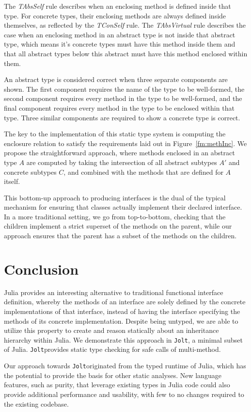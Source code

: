 \documentclass[preprint]{sigplanconf}
\newcommand{\xt}[1]{\texttt{#1}}
\newcommand{\jolt}{\xt{Jolt}}
\begin{document}
The \textit{TAbsSelf} rule describes when an enclosing method is defined inside that type. 
For concrete types, their enclosing methods are always defined inside themselves, as reflected by the \textit{TConSelf} rule.
The \textit{TAbsVirtual} rule describes the case when an enclosing method in an abstract type 
is not inside that abstract type, which means it's concrete types must have this method inside them
and that all abstract types below this abstract must have this method enclosed within them.

An abstract type is considered correct when three separate components are shown. The first component requires the name of the type to be well-formed, 
the second component requires every method in the type to be well-formed, and the final component requires every method in the type to be enclosed within that type. 
Three similar components are required to show a concrete type is correct.

The key to the implementation of this static type system is computing the 
enclosure relation to satisfy the requirements laid out in Figure~\ref{fm:methInc}.
We propose the straightforward approach, where methods enclosed in an
abstract type $A$ are computed by taking the intersection of all abstract subtypes
$A'$ and concrete subtypes $C$, and combined with the methods that are defined for $A$
itself. 

This bottom-up approach to producing interfaces is the dual of the typical mechanism
for ensuring that classes actually implement their declared interface. In a more
traditional setting, we go from top-to-bottom, checking that the children 
implement a strict superset of the methods on the parent, while our approach 
ensures that the parent has a subset of the methods on the children.

\section{Conclusion}

Julia provides an interesting alternative to traditional functional interface 
definition, whereby the methods of an interface are solely defined by 
the concrete implementations of that interface, instead of having the interface specifying
the methods of its concrete implementation. Despite being
untyped, we are able to utilize this property to create and reason statically about an inheritance
hierarchy within Julia. We demonstrate this approach in \jolt\space, a minimal subset
of Julia. \jolt\space provides static type checking for safe calls of multi-method.

Our approach towards \jolt\space originated from the typed runtime of Julia, which has the potential to
provide the basis for other static analyses. New language features, such as purity, that leverage
existing types in Julia code could also provide additional performance and usability, with few to
no changes required to the existing codebase.



\end{document}
